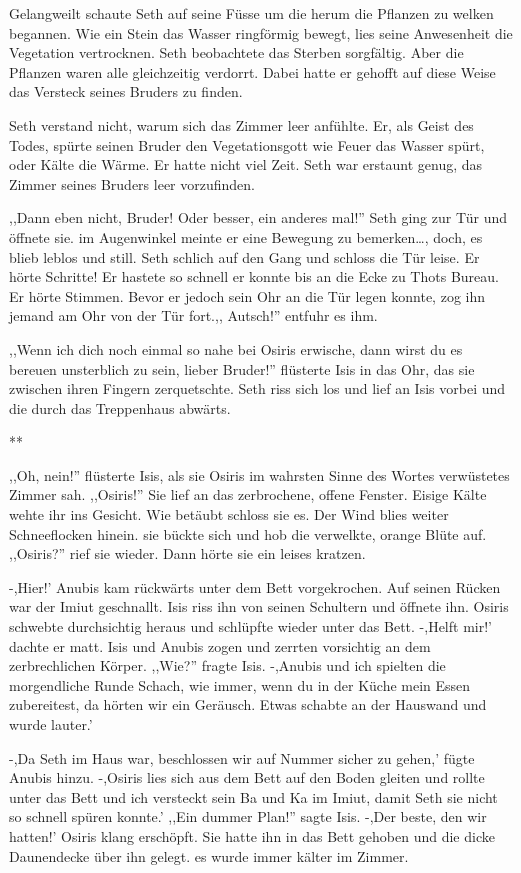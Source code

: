 \documentclass[11pt,titlepage,a5paper]{book}
\newcommand{\sterne}{\par{\centering ***\par}}
\begin{document}
Gelangweilt schaute Seth auf seine Füsse um die herum die Pflanzen zu welken begannen. Wie ein Stein das Wasser ringförmig bewegt, lies seine Anwesenheit die Vegetation vertrocknen. Seth beobachtete das Sterben sorgfältig. Aber die Pflanzen waren alle gleichzeitig verdorrt. Dabei hatte er gehofft auf diese Weise das Versteck seines Bruders zu finden. 

Seth verstand nicht, warum sich das Zimmer leer anfühlte. Er, als Geist des Todes, spürte seinen Bruder den Vegetationsgott wie Feuer das Wasser spürt, oder Kälte die Wärme. Er hatte nicht viel Zeit. Seth war erstaunt genug, das Zimmer seines Bruders leer vorzufinden. 

,,Dann eben nicht, Bruder! Oder besser, ein anderes mal!'' Seth ging zur Tür und öffnete sie. im Augenwinkel meinte er eine Bewegung zu bemerken\dots , doch, es blieb leblos und still. Seth schlich auf den Gang und schloss die Tür leise. Er hörte Schritte! Er hastete so schnell er konnte bis  an die Ecke zu Thots Bureau. Er hörte Stimmen. Bevor er jedoch sein Ohr an die Tür legen konnte, zog ihn jemand am Ohr von der Tür fort.,, Autsch!'' entfuhr es ihm.

,,Wenn ich dich noch einmal so nahe bei Osiris erwische, dann wirst du es bereuen unsterblich zu sein, lieber Bruder!'' flüsterte Isis in das Ohr, das sie zwischen ihren Fingern zerquetschte. Seth riss sich los und lief an Isis vorbei und die durch das Treppenhaus abwärts.

\sterne

,,Oh, nein!'' flüsterte Isis, als sie Osiris im wahrsten Sinne des Wortes verwüstetes Zimmer sah. ,,Osiris!'' Sie lief an das zerbrochene, offene Fenster. Eisige Kälte wehte ihr ins Gesicht. Wie betäubt schloss sie es. Der Wind blies weiter Schneeflocken hinein. sie bückte sich und hob die verwelkte, orange Blüte auf. ,,Osiris?'' rief sie wieder. Dann hörte sie ein leises kratzen.

-,Hier!' Anubis kam rückwärts unter dem Bett vorgekrochen. Auf seinen Rücken war der Imiut geschnallt. Isis riss ihn von seinen Schultern und öffnete ihn. Osiris schwebte durchsichtig heraus und schlüpfte wieder unter das Bett. -,Helft mir!' dachte er matt. Isis und Anubis zogen und zerrten vorsichtig an dem zerbrechlichen Körper. ,,Wie?'' fragte Isis. -,Anubis und ich spielten die morgendliche Runde Schach, wie immer, wenn du in der Küche mein Essen zubereitest, da hörten wir ein Geräusch. Etwas schabte an der Hauswand und wurde lauter.'

-,Da Seth im Haus war, beschlossen wir auf Nummer sicher zu gehen,' fügte Anubis hinzu. -,Osiris lies sich aus dem Bett auf den Boden gleiten und rollte unter das Bett und ich versteckt sein Ba und Ka im Imiut, damit Seth sie nicht so schnell spüren konnte.' ,,Ein dummer Plan!'' sagte Isis. -,Der beste, den wir hatten!' Osiris klang erschöpft. Sie hatte ihn in das Bett gehoben und die dicke Daunendecke über ihn gelegt. es wurde immer kälter im Zimmer.
\end{document}
